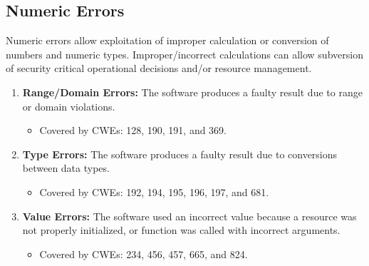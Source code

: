 \documentclass{article}
\begin{document}
\subsection{Numeric Errors}
Numeric errors allow exploitation of improper calculation or conversion of numbers and numeric types. Improper/incorrect calculations can allow subversion of security critical operational decisions and/or resource management.
\begin{enumerate}
    \item \textbf{Range/Domain Errors:} The software produces a faulty result due to range or domain violations.
    \begin{itemize}
        \item Covered by CWEs: 128, 190, 191, and 369.
    \end{itemize}
    
    \item \textbf{Type Errors:} The software produces a faulty result due to conversions between data types.
    \begin{itemize}
        \item Covered by CWEs:  192, 194, 195, 196, 197, and 681.
    \end{itemize}
    
    \item \textbf{Value Errors:} The software used an incorrect value because a resource was not properly initialized, or function was called with incorrect arguments. 
    \begin{itemize}
        \item Covered by CWEs: 234, 456, 457, 665, and 824.
    \end{itemize}
\end{enumerate} 
\end{document}
